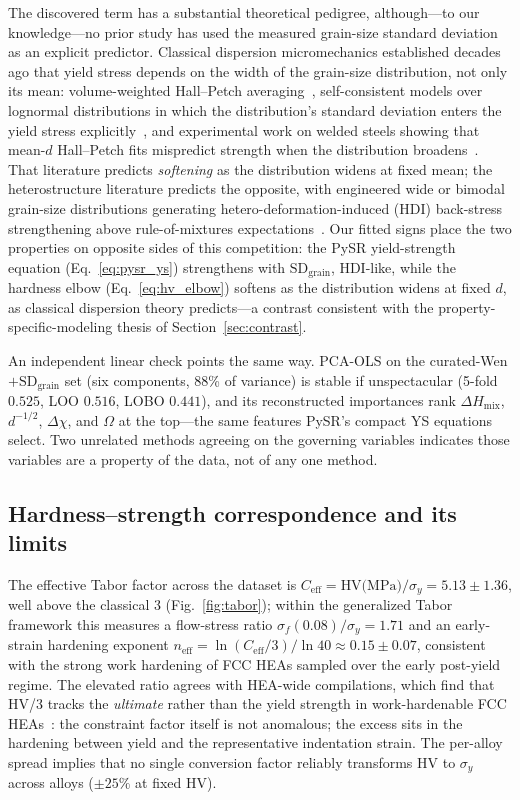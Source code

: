 \documentclass[5p,times,twocolumn]{elsarticle}
\begin{document}
The discovered term has a substantial theoretical pedigree, although---to our knowledge---no prior study has used the measured grain-size standard deviation as an explicit predictor. Classical dispersion micromechanics established decades ago that yield stress depends on the width of the grain-size distribution, not only its mean: volume-weighted Hall--Petch averaging~\cite{Kurzydlowski1990}, self-consistent models over lognormal distributions in which the distribution's standard deviation enters the yield stress explicitly~\cite{Berbenni2007}, and experimental work on welded steels showing that mean-$d$ Hall--Petch fits mispredict strength when the distribution broadens~\cite{Lehto2014}. That literature predicts \emph{softening} as the distribution widens at fixed mean; the heterostructure literature predicts the opposite, with engineered wide or bimodal grain-size distributions generating hetero-deformation-induced (HDI) back-stress strengthening above rule-of-mixtures expectations~\cite{Wang2002,ZhuWu2019}. Our fitted signs place the two properties on opposite sides of this competition: the PySR yield-strength equation (Eq.~\ref{eq:pysr_ys}) strengthens with $\text{SD}_\text{grain}$, HDI-like, while the hardness elbow (Eq.~\ref{eq:hv_elbow}) softens as the distribution widens at fixed $d$, as classical dispersion theory predicts---a contrast consistent with the property-specific-modeling thesis of Section~\ref{sec:contrast}.

An independent linear check points the same way. PCA-OLS on the curated-Wen$+$$\text{SD}_\text{grain}$ set (six components, 88\% of variance) is stable if unspectacular (5-fold $0.525$, LOO $0.516$, LOBO $0.441$), and its reconstructed importances rank $\Delta H_\text{mix}$, $d^{-1/2}$, $\Delta\chi$, and $\Omega$ at the top---the same features PySR's compact YS equations select. Two unrelated methods agreeing on the governing variables indicates those variables are a property of the data, not of any one method.

\subsection{Hardness--strength correspondence and its limits}
\label{sec:tabor}

The effective Tabor factor across the dataset is $C_\text{eff} = \text{HV(MPa)}/\sigma_y = 5.13 \pm 1.36$, well above the classical 3 (Fig.~\ref{fig:tabor}); within the generalized Tabor framework this measures a flow-stress ratio $\sigma_f(0.08)/\sigma_y = 1.71$ and an early-strain hardening exponent $n_\text{eff} = \ln(C_\text{eff}/3)/\ln 40 \approx 0.15 \pm 0.07$, consistent with the strong work hardening of FCC HEAs sampled over the early post-yield regime. The elevated ratio agrees with HEA-wide compilations, which find that HV/3 tracks the \emph{ultimate} rather than the yield strength in work-hardenable FCC HEAs~\cite{Tian2021,Fan2021}: the constraint factor itself is not anomalous; the excess sits in the hardening between yield and the representative indentation strain. The per-alloy spread implies that no single conversion factor reliably transforms HV to $\sigma_y$ across alloys ($\pm 25\%$ at fixed HV).
\end{document}
